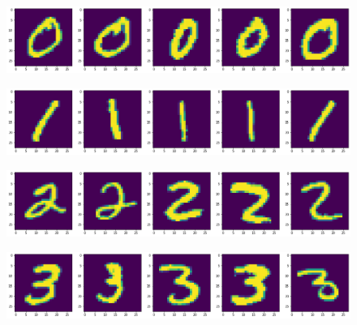\documentclass[
  letterpaper,
  DIV=11,
  numbers=noendperiod]{scrreprt}
\begin{document}
\begin{figure}[H]

{\centering \includegraphics{notebooks/W10. Machine Learning_files/figure-pdf/cell-5-output-1.png}

}

\end{figure}

\begin{figure}[H]

{\centering \includegraphics{notebooks/W10. Machine Learning_files/figure-pdf/cell-5-output-2.png}

}

\end{figure}

\begin{figure}[H]

{\centering \includegraphics{notebooks/W10. Machine Learning_files/figure-pdf/cell-5-output-3.png}

}

\end{figure}

\begin{figure}[H]

{\centering \includegraphics{notebooks/W10. Machine Learning_files/figure-pdf/cell-5-output-4.png}

}

\end{figure}
\end{document}
